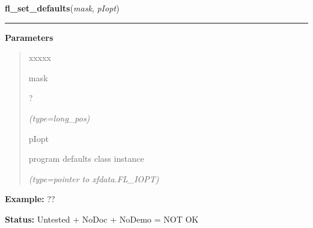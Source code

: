 \hspace{.8\funcindent}\begin{boxedminipage}{\funcwidth}

    \raggedright \textbf{fl\_set\_defaults}(\textit{mask}, \textit{pIopt})

    \vspace{-1.5ex}

    \rule{\textwidth}{0.5\fboxrule}
\setlength{\parskip}{2ex}
\setlength{\parskip}{1ex}
      \textbf{Parameters}
      \vspace{-1ex}

      \begin{quote}
        \begin{Ventry}{xxxxx}

          \item[mask]

          ?

            {\it (type=long\_pos)}

          \item[pIopt]

          program defaults class instance

            {\it (type=pointer to xfdata.FL\_IOPT)}

        \end{Ventry}

      \end{quote}

\textbf{Example:} ??



\textbf{Status:} Untested + NoDoc + NoDemo = NOT OK



    \end{boxedminipage}

    \label{xformslib:flxbasic:fl_set_tabstop}

    \vspace{0.5ex}

